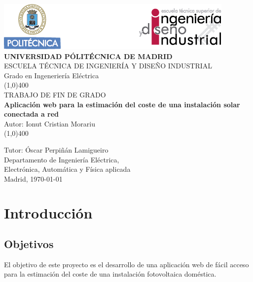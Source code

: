 \documentclass[11pt]{article}
\begin{document}
\begin{titlepage}



\begin{center}
	\includegraphics[scale=1]{cabecera}\\
	\vspace*{1cm}
	\Large{\textbf{\MakeUppercase{Universidad Pólitécnica de Madrid}}}\\[3mm]
	\Large{{\MakeUppercase{Escuela técnica de ingeniería y diseño industrial}}}\\[3mm]
	\Large {Grado en Ingeneriería Eléctrica}\\
	\vfill
	\line(1,0){400}\\
	\Large{{\MakeUppercase{Trabajo de fin de grado}}}\\
	\Huge{\textbf{Aplicación web para la estimación del coste de una instalación solar conectada a red}}\\[5mm]
	\Large{Autor: Ionut Cristian Morariu}\\
	\line(1,0){400}\\
	\vfill
\end{center}
\begin{flushright}
\Large {Tutor: Óscar Perpiñán Lamigueiro}\\[3mm]
\Large{Departamento de Ingeniería Eléctrica,\\ Electrónica, Automática y Física aplicada}\\[10mm]
Madrid, \today
\end{flushright}

\end{titlepage}

\renewcommand{\baselinestretch}{1.5} %
\renewcommand{\labelitemi}{\textbullet}

\tableofcontents
\thispagestyle{empty}
\clearpage

\setcounter{page}{1}


\section{Introducción}
\subsection{Objetivos}
El objetivo de este proyecto es el desarrollo de una aplicación web de fácil acceso para la estimación del coste de una instalación fotovoltaica doméstica.\\
\end{document}

